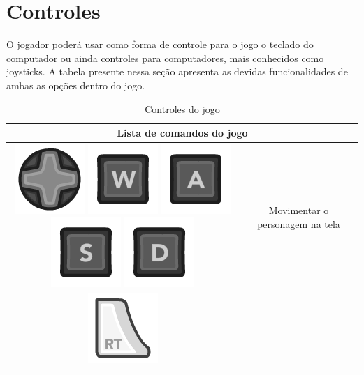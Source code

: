 \documentclass[12pt]{article}
\begin{document}
\section{Controles}
O jogador poderá usar como forma de controle para o jogo o teclado do computador ou ainda controles para computadores, mais conhecidos como joysticks. A tabela presente nessa seção apresenta as devidas funcionalidades de ambas as opções dentro do jogo.

\begin{longtable}{|c|c|}
\caption{Controles do jogo}
\\
\hline
\multicolumn{2}{|c|}{Lista de comandos do jogo}
\\
\hline
\includegraphics[scale=0.3]{images/360_Dpad.png}
\includegraphics[scale=0.3]{images/kW.png} 
\includegraphics[scale=0.3]{images/kA.png}
\includegraphics[scale=0.3]{images/kS.png}
\includegraphics[scale=0.3]{images/kD.png}
& Movimentar o personagem na tela
\\
\hline
\includegraphics[scale=0.3]{images/360_RT.png}

\end{longtable}
\end{document}
